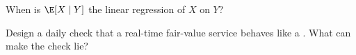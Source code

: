 \begin{interviewq}\label{iq:qm:probability-at-speed:5}
When is $\E[X \mid Y]$ the linear regression of $X$ on $Y$?
\end{interviewq}

\begin{interviewq}\label{iq:qm:probability-at-speed:6}
Design a daily check that a real-time fair-value service behaves like a . What can
make the check lie?
\end{interviewq}
